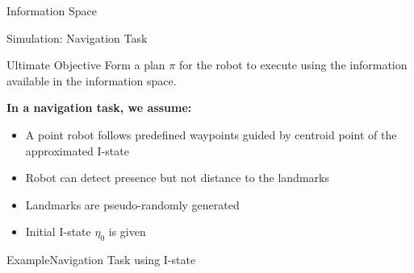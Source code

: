 \documentclass[10pt]{beamer}
\begin{document}
\begin{frame}{Information Space}
 \end{frame}

\begin{frame}{Simulation: Navigation Task}
 \begin{block}{Ultimate Objective} 
   Form a plan $\pi$ for the robot to execute using the information available in
   the information space.
 \end{block}

\textbf{In a navigation task, we assume:}
\begin{itemize}
\item A point robot follows predefined waypoints guided by centroid point of the
  approximated I-state
\item Robot can detect presence but not distance to the landmarks
\item Landmarks are pseudo-randomly generated
\item Initial I-state $\eta_0$ is given
\end{itemize}
\end{frame}

\begin{frame}{Example}{Navigation Task using I-state}
  \begin{center}
  \end{center}
\end{frame} 

\end{document}
